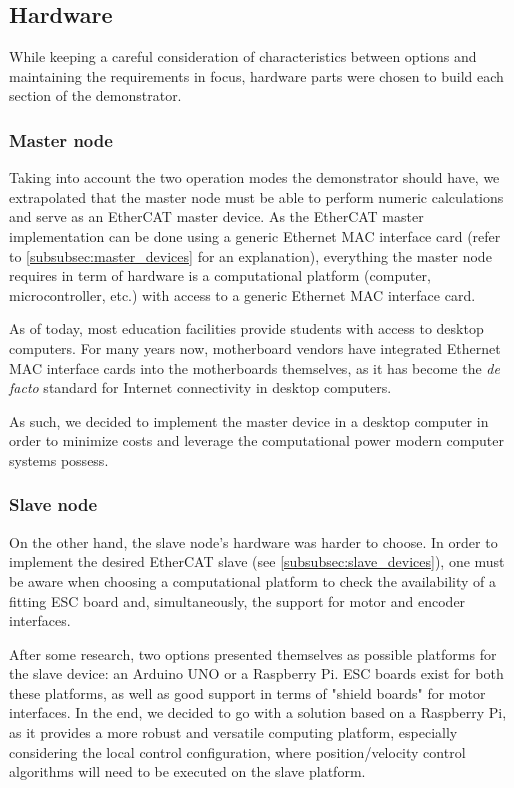 \subsection{Hardware} \label{sec:proposed-hardware}

While keeping a careful consideration of characteristics between options and maintaining the requirements in focus, hardware parts were chosen to build each section of the demonstrator.

\subsubsection{Master node}

Taking into account the two operation modes the demonstrator should have, we extrapolated that the master node must be able to perform numeric calculations and serve as an EtherCAT master device.
As the EtherCAT master implementation can be done using a generic Ethernet MAC interface card (refer to \ref{subsubsec:master_devices} for an explanation), everything the master node requires in term of hardware is a computational platform (computer, microcontroller, etc.) with access to a generic Ethernet MAC interface card.

As of today, most education facilities provide students with access to desktop computers.
For many years now, motherboard vendors have integrated Ethernet MAC interface cards into the motherboards themselves, as it has become the \emph{de facto} standard for Internet connectivity in desktop computers.

As such, we decided to implement the master device in a desktop computer in order to minimize costs and leverage the computational power modern computer systems possess.

\subsubsection{Slave node}

On the other hand, the slave node's hardware was harder to choose.
In order to implement the desired EtherCAT slave (see \ref{subsubsec:slave_devices}), one must be aware when choosing a computational platform to check the availability of a fitting ESC board and, simultaneously, the support for motor and encoder interfaces.

After some research, two options presented themselves as possible platforms for the slave device: an Arduino UNO or a Raspberry Pi.
ESC boards exist for both these platforms, as well as good support in terms of "shield boards" for motor interfaces.
In the end, we decided to go with a solution based on a Raspberry Pi, as it provides a more robust and versatile computing platform, especially considering the local control configuration, where position/velocity control algorithms will need to be executed on the slave platform.

